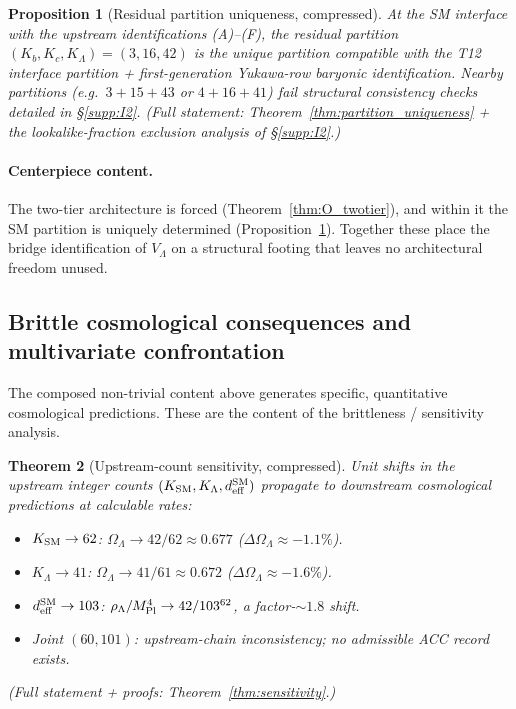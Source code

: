 \documentclass[11pt]{article}
\theoremstyle{plain}
\newtheorem{theorem}{Theorem}[section]
\newtheorem{proposition}[theorem]{Proposition}
\theoremstyle{definition}
\theoremstyle{remark}
\begin{document}
\begin{proposition}[Residual partition uniqueness, compressed]\label{prop:O_partition}
At the SM interface with the upstream identifications (A)--(F), the residual partition $(K_b, K_c, K_\Lambda) = (3, 16, 42)$ is the unique partition compatible with the T12 interface partition + first-generation Yukawa-row baryonic identification.  Nearby partitions (e.g.\ $3 + 15 + 43$ or $4 + 16 + 41$) fail structural consistency checks detailed in \S\ref{supp:I2}.  (Full statement: Theorem~\ref{thm:partition_uniqueness} + the lookalike-fraction exclusion analysis of \S\ref{supp:I2}.)
\end{proposition}

\paragraph{Centerpiece content.}  The two-tier architecture is forced (Theorem~\ref{thm:O_twotier}), and within it the SM partition is uniquely determined (Proposition~\ref{prop:O_partition}).  Together these place the bridge identification of $V_\Lambda$ on a structural footing that leaves no architectural freedom unused.

\bigskip

\subsection{Brittle cosmological consequences and multivariate confrontation}\label{supp:O_brittle}

The composed non-trivial content above generates specific, quantitative cosmological predictions.  These are the content of the brittleness / sensitivity analysis.

\begin{theorem}[Upstream-count sensitivity, compressed]\label{thm:O_brittleness}
Unit shifts in the upstream integer counts $(K_{\rm SM}, K_\Lambda, d_{\rm eff}^{\rm SM})$ propagate to downstream cosmological predictions at calculable rates:
\begin{itemize}[leftmargin=2em,itemsep=2pt]
  \item $K_{\rm SM} \to 62$: $\Omega_\Lambda \to 42/62 \approx 0.677$ ($\Delta\Omega_\Lambda \approx -1.1\%$).
  \item $K_\Lambda \to 41$: $\Omega_\Lambda \to 41/61 \approx 0.672$ ($\Delta\Omega_\Lambda \approx -1.6\%$).
  \item $d_{\rm eff}^{\rm SM} \to 103$: $\rho_\Lambda / M_{\rm Pl}^4 \to 42/103^{62}$, a factor-$\sim 1.8$ shift.
  \item Joint $(60, 101)$: upstream-chain inconsistency; no admissible ACC record exists.
\end{itemize}
(Full statement + proofs: Theorem~\ref{thm:sensitivity}.)
\end{theorem}
\end{document}
